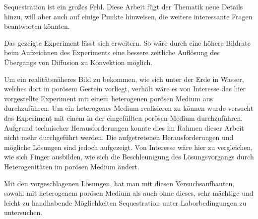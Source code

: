 

\COTm Sequestration ist ein großes Feld. Diese Arbeit fügt der Thematik neue Details hinzu, will aber auch auf einige Punkte hinweisen, die weitere interessante Fragen beantworten könnten.


Das gezeigte Experiment lässt sich erweitern. So wäre durch eine höhere Bildrate beim Aufzeichnen des Experiments eine bessere zeitliche Auflösung des Übergangs von Diffusion zu Konvektion möglich. 


Um ein realitätsnäheres Bild zu bekommen, wie sich \COT unter der Erde in Wasser, welches dort in porösem Gestein vorliegt, verhält wäre es von Interesse das hier vorgestellte \COTm Experiment mit einem heterogenen porösen Medium aus \BOG durchzuführen. 
Um ein heterogenes Medium realisieren zu können wurde versucht das Experiment mit einem in der \HSC eingefüllten porösen Medium durchzuführen. Aufgrund technischer Herausforderungen konnte dies im Rahmen dieser Arbeit nicht mehr durchgeführt werden. Die aufgetretenen Herausforderungen und mögliche Lösungen sind jedoch aufgezeigt.
Von Interesse wäre hier zu vergleichen, wie sich Finger ausbilden, \dah wie sich die Beschleunigung des Lösungsvorgangs durch Heterogenitäten im porösen Medium ändert.

Mit den vorgeschlagenen Lösungen, hat man mit diesen Versuchsaufbauten, sowohl mit heterogenem porösen Medium als auch ohne dieses, sehr mächtige und leicht zu handhabende Möglichkeiten \COTm Sequestration unter Laborbedingungen zu untersuchen.